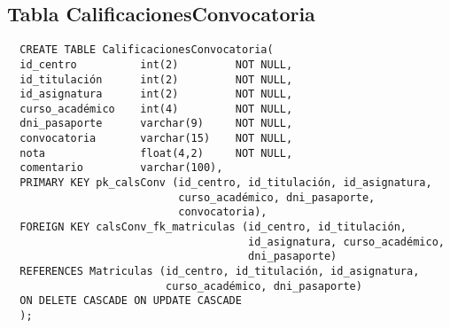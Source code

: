 \subsection{Tabla CalificacionesConvocatoria}

\begin{verbatim}
  CREATE TABLE CalificacionesConvocatoria(
  id_centro          int(2)         NOT NULL,
  id_titulación      int(2)         NOT NULL,
  id_asignatura      int(2)         NOT NULL,
  curso_académico    int(4)         NOT NULL,
  dni_pasaporte      varchar(9)     NOT NULL,
  convocatoria       varchar(15)    NOT NULL,
  nota               float(4,2)     NOT NULL,
  comentario         varchar(100),
  PRIMARY KEY pk_calsConv (id_centro, id_titulación, id_asignatura,
                           curso_académico, dni_pasaporte,
                           convocatoria),
  FOREIGN KEY calsConv_fk_matriculas (id_centro, id_titulación,
                                      id_asignatura, curso_académico,
                                      dni_pasaporte)
  REFERENCES Matriculas (id_centro, id_titulación, id_asignatura,
                         curso_académico, dni_pasaporte)
  ON DELETE CASCADE ON UPDATE CASCADE
  );
\end{verbatim}
